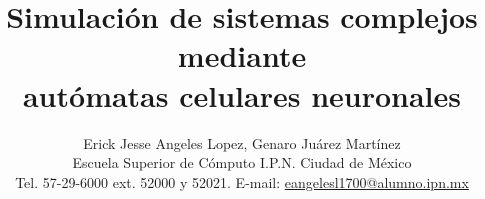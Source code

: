 \documentclass[twocolumn,10pt,letterpaper]{article}
\title{
	\textbf{\Large Simulación de sistemas complejos mediante \\ autómatas celulares neuronales}\\
}
\author{
	\normalsize Erick Jesse Angeles Lopez, Genaro Juárez Martínez \\[0.2em]
	\small Escuela Superior de Cómputo I.P.N. Ciudad de México \\
	\small Tel. 57-29-6000 ext. 52000 y 52021. E-mail: \url{eangelesl1700@alumno.ipn.mx}
}
\date{}
\begin{document}
	\maketitle

	
	
	
	
	
	

	
	{\footnotesize}
\end{document}
